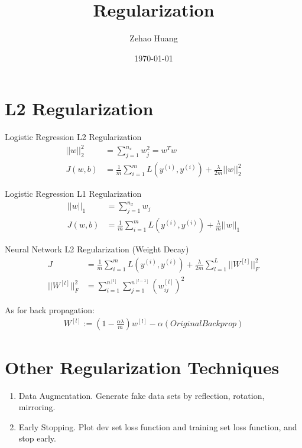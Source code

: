 \documentclass{article}
\title{Regularization}
\author{Zehao Huang}
\date{\today}
\begin{document}
    \maketitle

    \section{L2 Regularization}

    Logistic Regression L2 Regularization
    \begin{align*}
        ||w||_2^2 &= \sum_{j=1}^{n_x} w_j^2 = w^T w \\
        J(w,b)    &= \frac{1}{m} \sum_{i=1}^m L(y^{(i)}, y^{(i)}) + \frac{\lambda}{2m} ||w||_2^2
    \end{align*}

    Logistic Regression L1 Regularization
    \begin{align*}
        ||w||_1   &= \sum_{j=1}^{n_x} w_j \\
        J(w,b)    &= \frac{1}{m} \sum_{i=1}^m L(y^{(i)}, y^{(i)}) + \frac{\lambda}{m} ||w||_1
    \end{align*}

    Neural Network L2 Regularization (Weight Decay)
    \begin{align*}
        J               &= \frac{1}{m} \sum_{i=1}^m L(y^{(i)} , y^{(i)}) + \frac{\lambda}{2m} \sum_{l=1}^L ||W^{[l]}||_F^2 \\
        ||W^{[l]}||_F^2 &= \sum_{i=1}^{n^{[l]}} \sum_{j=1}^{n^{[l-1]}} (w_{ij}^{[l]})^2
    \end{align*}

    As for back propagation: 
    \begin{align*}
        W^{[l]} := (1 - \frac{\alpha \lambda}{m})w^{[l]} - \alpha(Original Backprop)
    \end{align*}

    \section{Other Regularization Techniques}

    \begin{enumerate}
        \item Data Augmentation. Generate fake data sets by reflection, rotation, mirroring. 
        \item Early Stopping. Plot dev set loss function and training set loss function, and stop early. 
    \end{enumerate}
\end{document}
